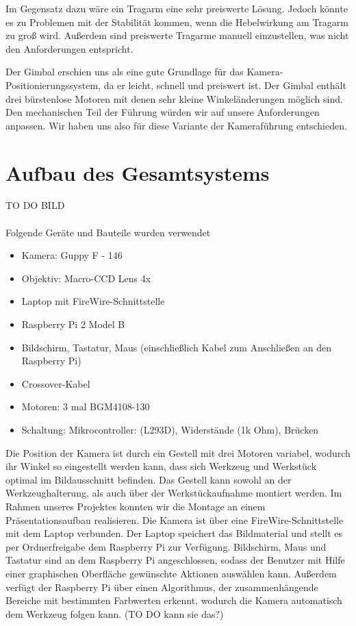 \documentclass[12pt,a4paper,bibliography=totocnumbered,listof=totocnumbered]{scrartcl}
\begin{document}
Im Gegensatz dazu wäre ein Tragarm eine sehr preiswerte Lösung. Jedoch könnte es zu Problemen mit der Stabilität kommen, wenn die Hebelwirkung am Tragarm zu groß wird. Außerdem sind preiswerte Tragarme manuell einzustellen, was nicht den Anforderungen entspricht.

Der Gimbal erschien uns als eine gute Grundlage für das Kamera-Positionierungssystem, da er leicht, schnell und preiswert ist. Der Gimbal enthält drei bürstenlose Motoren mit denen sehr kleine Winkeländerungen möglich sind. Den mechanischen Teil der Führung würden wir auf unsere Anforderungen anpassen. Wir haben uns also für diese Variante der Kameraführung entschieden.

\section{Aufbau des Gesamtsystems}
TO DO BILD \\ \\
Folgende Geräte und Bauteile wurden verwendet
\begin{itemize} 
\item Kamera: Guppy F - 146
\item Objektiv: Macro-CCD Lens 4x
\item Laptop mit FireWire-Schnittstelle
\item Raspberry Pi 2 Model B 
\item Bildschirm, Tastatur, Maus (einschließlich Kabel zum Anschließen an den Raspberry Pi)
\item Crossover-Kabel
\item Motoren: 3 mal BGM4108-130
\item Schaltung: Mikrocontroller: (L293D), Widerstände (1k Ohm), Brücken
\end{itemize}

Die Position der Kamera ist durch ein Gestell mit drei Motoren variabel, wodurch ihr Winkel so eingestellt werden kann, dass sich Werkzeug und Werkstück optimal im Bildausschnitt befinden. Das Gestell kann sowohl an der Werkzeughalterung, als auch über der Werkstückaufnahme montiert werden. Im Rahmen unseres Projektes konnten wir die Montage an einem Präsentationsaufbau realisieren.
Die Kamera ist über eine FireWire-Schnittstelle mit dem Laptop verbunden. Der Laptop speichert das Bildmaterial und stellt es per Ordnerfreigabe dem Raspberry Pi zur Verfügung. Bildschirm, Maus und Tastatur sind an dem Raspberry Pi angeschlossen, sodass der Benutzer mit Hilfe einer graphischen Oberfläche gewünschte Aktionen auswählen kann. Außerdem verfügt der Raspberry Pi über einen Algorithmus, der zusammenhängende Bereiche mit bestimmten Farbwerten erkennt, wodurch die Kamera automatisch dem Werkzeug folgen kann. (TO DO kann sie das?)
\end{document}
